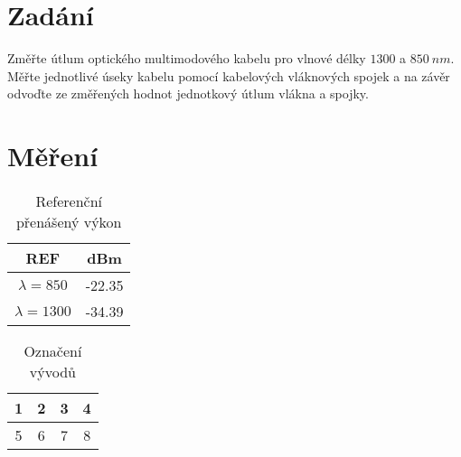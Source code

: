 \section{Zadání}
Změřte útlum optického multimodového kabelu pro vlnové délky \(1300\) a \(850~nm\). Měřte jednotlivé úseky kabelu pomocí kabelových vláknových spojek a na
závěr odvoďte ze změřených hodnot jednotkový útlum vlákna a spojky. 

\section{Měření}

\begin{table}[h]
    \centering
    \begin{tabular}{|c|c|}
        \hline
        \textbf{REF}     & \textbf{dBm} \\ \hline
        $\lambda = 850$  & -22.35       \\ \hline
        $\lambda = 1300$ & -34.39       \\ \hline
    \end{tabular}
    \caption{Referenční přenášený výkon}
\end{table}

\begin{table}[h]
    \centering
    \begin{tabular}{|c|c|c|c|}
        \hline
        1 & 2 & 3 & 4 \\ \hline
        5 & 6 & 7 & 8 \\ \hline
    \end{tabular}
    \caption{Označení vývodů}
\end{table}


